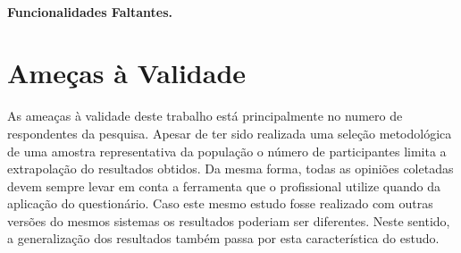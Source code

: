 \paragraph{Funcionalidades Faltantes.}
\label{par:pesq_profissionais_funcionalidades_faltantes}




\section{Ameças à Validade}
As ameaças à validade deste trabalho está principalmente no numero de
respondentes da pesquisa. Apesar de ter sido realizada uma seleção metodológica
de uma amostra representativa da população o número de participantes limita a
extrapolação do resultados obtidos. Da mesma forma, todas as opiniões coletadas
devem sempre levar em conta a ferramenta que o profissional utilize quando da
aplicação do questionário. Caso este mesmo estudo fosse realizado com outras
versões do mesmos sistemas os resultados poderiam ser diferentes. Neste sentido,
a generalização dos resultados também passa por esta característica do estudo.


\label{sec:resumo_do_capitulo}
